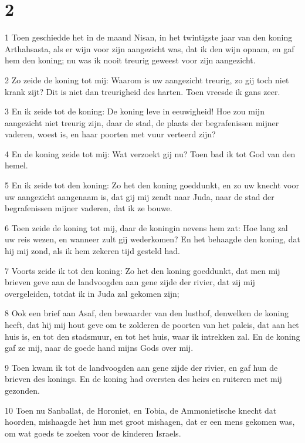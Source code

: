 \chapter{2}

\par 1 Toen geschiedde het in de maand Nisan, in het twintigste jaar van den koning Arthahsasta, als er wijn voor zijn aangezicht was, dat ik den wijn opnam, en gaf hem den koning; nu was ik nooit treurig geweest voor zijn aangezicht.
\par 2 Zo zeide de koning tot mij: Waarom is uw aangezicht treurig, zo gij toch niet krank zijt? Dit is niet dan treurigheid des harten. Toen vreesde ik gans zeer.
\par 3 En ik zeide tot de koning: De koning leve in eeuwigheid! Hoe zou mijn aangezicht niet treurig zijn, daar de stad, de plaats der begrafenissen mijner vaderen, woest is, en haar poorten met vuur verteerd zijn?
\par 4 En de koning zeide tot mij: Wat verzoekt gij nu? Toen bad ik tot God van den hemel.
\par 5 En ik zeide tot den koning: Zo het den koning goeddunkt, en zo uw knecht voor uw aangezicht aangenaam is, dat gij mij zendt naar Juda, naar de stad der begrafenissen mijner vaderen, dat ik ze bouwe.
\par 6 Toen zeide de koning tot mij, daar de koningin nevens hem zat: Hoe lang zal uw reis wezen, en wanneer zult gij wederkomen? En het behaagde den koning, dat hij mij zond, als ik hem zekeren tijd gesteld had.
\par 7 Voorts zeide ik tot den koning: Zo het den koning goeddunkt, dat men mij brieven geve aan de landvoogden aan gene zijde der rivier, dat zij mij overgeleiden, totdat ik in Juda zal gekomen zijn;
\par 8 Ook een brief aan Asaf, den bewaarder van den lusthof, denwelken de koning heeft, dat hij mij hout geve om te zolderen de poorten van het paleis, dat aan het huis is, en tot den stadsmuur, en tot het huis, waar ik intrekken zal. En de koning gaf ze mij, naar de goede hand mijns Gods over mij.
\par 9 Toen kwam ik tot de landvoogden aan gene zijde der rivier, en gaf hun de brieven des konings. En de koning had oversten des heirs en ruiteren met mij gezonden.
\par 10 Toen nu Sanballat, de Horoniet, en Tobia, de Ammonietische knecht dat hoorden, mishaagde het hun met groot mishagen, dat er een mens gekomen was, om wat goeds te zoeken voor de kinderen Israels.
